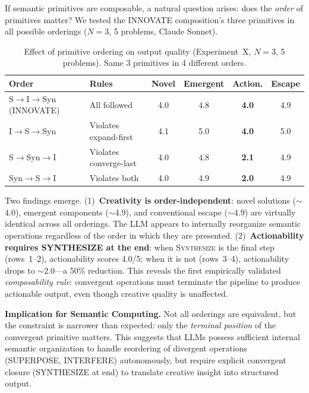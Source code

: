 \documentclass[11pt,a4paper]{article}
\begin{document}
If semantic primitives are composable, a natural question arises: does the \emph{order} of primitives matter? We tested the INNOVATE composition's three primitives in all possible orderings ($N=3$, 5 problems, Claude Sonnet).

\begin{table}[H]
\centering
\caption{Effect of primitive ordering on output quality (Experiment~X, $N=3$, 5 problems). Same 3 primitives in 4 different orders.}
\small
\begin{tabular}{llcccc}
\toprule
\textbf{Order} & \textbf{Rules} & \textbf{Novel} & \textbf{Emergent} & \textbf{Action.} & \textbf{Escape} \\
\midrule
S$\to$I$\to$Syn (INNOVATE) & All followed        & 4.0 & 4.8 & \textbf{4.0} & 4.9 \\
I$\to$S$\to$Syn            & Violates expand-first & 4.1 & 5.0 & \textbf{4.0} & 5.0 \\
S$\to$Syn$\to$I            & Violates converge-last & 4.0 & 4.8 & \textbf{2.1} & 4.9 \\
Syn$\to$S$\to$I            & Violates both        & 4.0 & 4.9 & \textbf{2.0} & 4.9 \\
\bottomrule
\end{tabular}
\label{tab:composability-rules}
\end{table}

Two findings emerge. (1)~\textbf{Creativity is order-independent}: novel solutions ($\sim$4.0), emergent components ($\sim$4.9), and conventional escape ($\sim$4.9) are virtually identical across all orderings. The LLM appears to internally reorganize semantic operations regardless of the order in which they are presented. (2)~\textbf{Actionability requires SYNTHESIZE at the end}: when \textsc{Synthesize} is the final step (rows~1--2), actionability scores 4.0/5; when it is not (rows~3--4), actionability drops to $\sim$2.0---a 50\% reduction. This reveals the first empirically validated \emph{composability rule}: convergent operations must terminate the pipeline to produce actionable output, even though creative quality is unaffected.

\textbf{Implication for Semantic Computing.} Not all orderings are equivalent, but the constraint is narrower than expected: only the \emph{terminal position} of the convergent primitive matters. This suggests that LLMs possess sufficient internal semantic organization to handle reordering of divergent operations (SUPERPOSE, INTERFERE) autonomously, but require explicit convergent closure (SYNTHESIZE at end) to translate creative insight into structured output.
\end{document}

